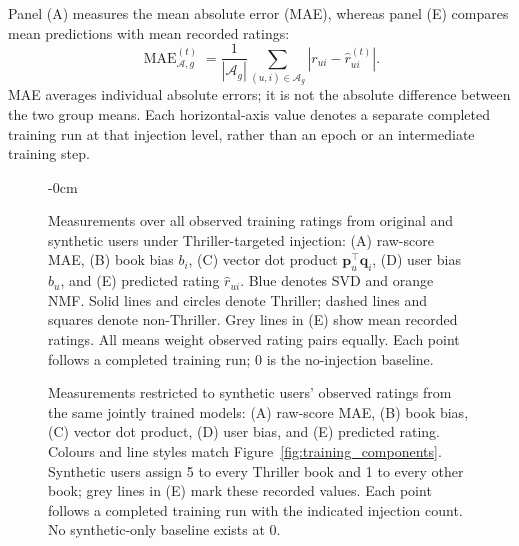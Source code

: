 Panel (A) measures the mean absolute error (MAE), whereas panel (E) compares mean predictions with mean recorded ratings:
\begin{equation}
\label{eq:training_group_mae}
\operatorname{MAE}_{\mathcal A,g}^{(t)}
=\frac{1}{|\mathcal A_g|}\sum_{(u,i)\in\mathcal A_g}
\left|r_{ui}-\hat r_{ui}^{(t)}\right|.
\end{equation}
MAE averages individual absolute errors; it is not the absolute difference between the two group means. Each horizontal-axis value denotes a separate completed training run at that injection level, rather than an epoch or an intermediate training step.

\begin{figure}[htbp]
\begin{adjustwidth}{-\extralength}{0cm}
\noindent
\begin{minipage}[t]{0.49\fulllength}
\vspace{0pt}
\centering
{}
\caption{Measurements over all observed training ratings from original and synthetic users under Thriller-targeted injection: (A) raw-score MAE, (B) book bias $b_i$, (C) vector dot product $\mathbf p_u^\top\mathbf q_i$, (D) user bias $b_u$, and (E) predicted rating $\hat r_{ui}$. Blue denotes SVD and orange NMF. Solid lines and circles denote Thriller; dashed lines and squares denote non-Thriller. Grey lines in (E) show mean recorded ratings. All means weight observed rating pairs equally. Each point follows a completed training run; 0 is the no-injection baseline.}
\label{fig:training_components}
\label{fig:bi}
\end{minipage}\hfill
\begin{minipage}[t]{0.49\fulllength}
\vspace{0pt}
\centering
{}
\caption{Measurements restricted to synthetic users' observed ratings from the same jointly trained models: (A) raw-score MAE, (B) book bias, (C) vector dot product, (D) user bias, and (E) predicted rating. Colours and line styles match Figure~\ref{fig:training_components}. Synthetic users assign 5 to every Thriller book and 1 to every other book; grey lines in (E) mark these recorded values. Each point follows a completed training run with the indicated injection count. No synthetic-only baseline exists at 0.}
\label{fig:training_synthetic_components}
\end{minipage}
\end{adjustwidth}
\end{figure}

